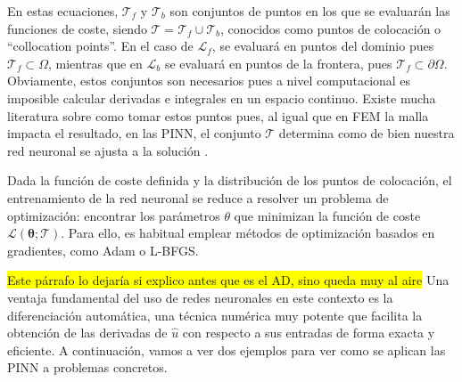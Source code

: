 \documentclass[a4paper,11pt,spanish, twoside, leqno]{tfg-uam}
\theoremstyle{definition}
\begin{document}
En estas ecuaciones, $\mathcal{T}_f$ y $\mathcal{T}_b$ son conjuntos de puntos en los que se evaluarán las funciones de coste, siendo $\mathcal{T}= \mathcal{T}_f\cup\mathcal{T}_b$, conocidos como puntos de colocación o ``collocation points''. En el caso de $\mathcal{L}_f$, se evaluará en puntos del dominio pues $\mathcal{T}_f\subset\Omega$, mientras que en $\mathcal{L}_b$ se evaluará en puntos de la frontera, pues $\mathcal{T}_f\subset\partial\Omega$. Obviamente, estos conjuntos son necesarios pues a nivel computacional es imposible calcular derivadas e integrales en un espacio continuo. Existe mucha literatura sobre como tomar estos puntos pues, al igual que en FEM la malla impacta el resultado, en las PINN, el conjunto $\mathcal{T}$ determina como de bien nuestra red neuronal se ajusta a la solución \cite{münzer2022curriculumtrainingbasedstrategydistributingcollocation}\cite{aikawa2024improving}\cite{matsubara2023goodlatticetrainingphysicsinformed}\cite{subramanian2022adaptiveselfsupervisionalgorithmsphysicsinformed}\cite{hou2023enhancing}.  

Dada la función de coste definida y la distribución de los puntos de colocación, el entrenamiento de la red neuronal se reduce a resolver un problema de optimización: encontrar los parámetros $\theta$ que minimizan la función de coste $\mathcal{L}(\boldsymbol{\theta}; \mathcal{T})$. Para ello, es habitual emplear métodos de optimización basados en gradientes, como Adam o L-BFGS. 

\colorbox{yellow}{Este párrafo lo dejaría si explico antes que es el AD, sino queda muy al aire}
Una ventaja fundamental del uso de redes neuronales en este contexto es la diferenciación automática, una técnica numérica muy potente que facilita la obtención de las derivadas de $\hat{u}$ con respecto a sus entradas de forma exacta y eficiente.
A continuación, vamos a ver dos ejemplos para ver como se aplican las PINN a problemas concretos.
\end{document}
